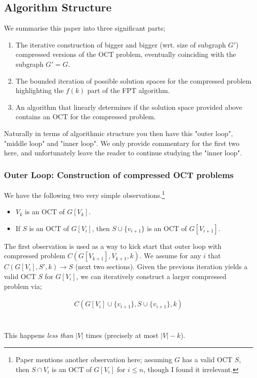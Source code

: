 \documentclass{article}
\begin{document}
\pagebreak

\subsection{Algorithm Structure}
We summarise this paper into three significant parts;

\begin{enumerate}
	\item The iterative construction of bigger and bigger (wrt. size of subgraph $G'$) compressed versions of the OCT problem, eventually coinciding with the subgraph $G' = G$.
	\item The bounded iteration of possible solution spaces for the compressed problem highlighting the $f(k)$ part of the FPT algorithm.
	\item An algorithm that linearly determines if the solution space provided above contains an OCT for the compressed problem.   
\end{enumerate}

Naturally in terms of algorithmic structure you then have this "outer loop", "middle loop" and "inner loop". We only provide commentary for the first two here, and unfortunately leave the reader to continue studying the "inner loop".

\subsubsection{Outer Loop: Construction of compressed OCT problems}
We have the following two very simple observations.\footnote{Paper mentions another observation here; assuming $G$ has a valid OCT $S$, then $S \cap V_i$ is an OCT of $G[V_i]$ for $i \leq n$, though I found it irrelevant.}

\begin{itemize}
				\item $V_k$ is an OCT of $G[V_k]$.
				\item If $S$ is an OCT of $G[V_i]$, then $S \cup \{v_{i+1}\}$ is an OCT of $G[V_{i+1}]$.
\end{itemize}

The first observation is used as a way to kick start that outer loop with compressed problem $C(G[V_{k+1}], V_{k+1}, k)$. We assume for any $i$ that $C(G[V_i], S', k) \rightarrow S$ (next two sections). Given the previous iteration yields a valid OCT $S$ for $G[V_i]$, we can iteratively construct a larger compressed problem via; 

\begin{align*}
C(G[V_i] \cup \{v_{i+1}\}, S \cup \{v_{i+1}\}, k)
\end{align*}
\\~\\
This happens {\em less than} $|V|$ times (precisely at most $|V| - k$).
\end{document}
